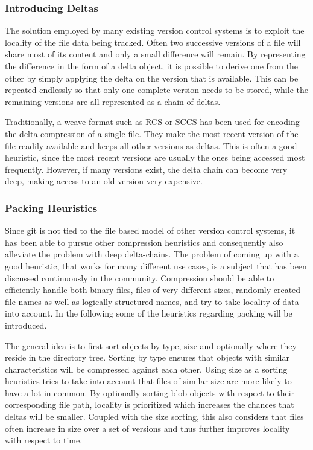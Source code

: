 \subsubsection{Introducing Deltas}


The solution employed by many existing version control systems is to
exploit the locality of the file data being tracked. Often two
successive versions of a file will share most of its content and only
a small difference will remain. By representing the difference in the
form of a delta object, it is possible to derive one from the other by
simply applying the delta on the version that is available. This can
be repeated endlessly so that only one complete version needs to be
stored, while the remaining versions are all represented as a chain
of deltas.

Traditionally, a weave format such as RCS or SCCS has been used for
encoding the delta compression of a single file. They make the
most recent version of the file readily available and keeps all other
versions as deltas. This is often a good heuristic, since the most
recent versions are usually the ones being accessed most frequently.
However, if many versions exist, the delta chain can become very deep,
making access to an old version very expensive.


\subsubsection{Packing Heuristics}

Since git is not tied to the file based model of other version control
systems, it has been able to pursue other compression heuristics and
consequently also alleviate the problem with deep delta-chains. The
problem of coming up with a good heuristic, that works for many
different use cases, is a subject that has been discussed continuously
in the community. Compression should be able to efficiently handle
both binary files, files of very different sizes, randomly created
file names as well as logically structured names, and try to take
locality of data into account. In the following some of the heuristics
regarding packing will be introduced.

The general idea is to first sort objects by type, size and optionally
where they reside in the directory tree. Sorting by type ensures that
objects with similar characteristics will be compressed against each
other. Using size as a sorting heuristics tries to take into
account that files of similar size are more likely to have a lot in
common. By optionally sorting blob objects with respect to their
corresponding file path, locality is prioritized which increases the
chances that deltas will be smaller. Coupled with the size sorting,
this also considers that files often increase in size over a set of
versions and thus further improves locality with respect to time.

